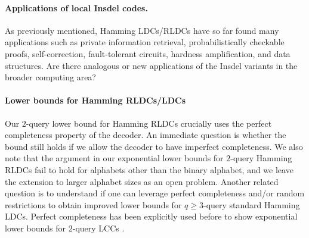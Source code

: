 \documentclass[10pt,a4paper]{article}
\theoremstyle{remark}
\newcommand{\authnote}[3]{\textcolor{#2}{{\sf (#1's Note: {\sl{#3}})}}}
\newcommand{\minshen}{\authnote{Minshen}{purple}}
\newcommand{\authnote}{}
\newcommand{\minshen}[1]{}
\begin{document}





\paragraph{Applications of local Insdel codes.} As previously mentioned, Hamming LDCs/RLDCs have so far found many applications such as private information retrieval, probabilistically checkable proofs, self-correction,  fault-tolerant circuits,  hardness amplification, and data structures. Are there analogous or new applications of the Insdel variants in the broader computing area?

\paragraph{Lower bounds for Hamming RLDCs/LDCs} Our $2$-query lower bound for Hamming RLDCs crucially uses the perfect completeness property of the decoder. An immediate question is whether the bound still holds if we allow the decoder to have imperfect completeness. We also note that the argument in our exponential lower bounds for $2$-query Hamming RLDCs fail to hold for alphabets other than the binary alphabet, and we leave the extension to larger alphabet sizes as an open problem. 
Another related question is to understand if one can leverage perfect completeness and/or random restrictions to obtain improved lower bounds for $q\geq 3$-query standard Hamming LDCs. Perfect completeness has been explicitly used before to show exponential lower bounds for $2$-query LCCs \cite{bhattacharyya2017lower}.
\end{document}
